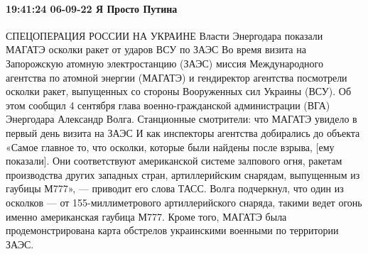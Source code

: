 \paragraph{19:41:24 06-09-22 Я Просто Путина}

СПЕЦОПЕРАЦИЯ РОССИИ НА УКРАИНЕ
Власти Энергодара показали МАГАТЭ осколки ракет от ударов ВСУ по ЗАЭС Во время визита на Запорожскую атомную электростанцию (ЗАЭС) миссия Международного агентства по атомной энергии (МАГАТЭ) и гендиректор агентства посмотрели осколки ракет, выпущенных со стороны Вооруженных сил Украины (ВСУ). Об этом сообщил 4 сентября глава военно-гражданской администрации (ВГА) Энергодара Александр Волга.
Станционные смотрители: что МАГАТЭ увидело в первый день визита на ЗАЭС
И как инспекторы агентства добирались до объекта
«Самое главное то, что осколки, которые были найдены после взрыва, [ему показали]. Они соответствуют американской системе залпового огня, ракетам производства других западных стран, артиллерийским снарядам, выпущенным из гаубицы М777», — приводит его слова ТАСС.
Волга подчеркнул, что один из осколков — от 155-миллиметрового артиллерийского снаряда, такими ведет огонь именно американская гаубица М777. Кроме того, МАГАТЭ была продемонстрирована карта обстрелов украинскими военными по территории ЗАЭС.


